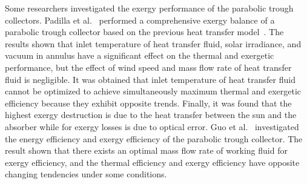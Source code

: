 Some researchers investigated the exergy performance of the parabolic trough collectors.
Padilla et al.~\cite{Padilla2014} performed a comprehensive exergy balance of a parabolic trough collector based on the previous heat transfer model~\cite{Padilla2011}. The results shown that inlet temperature of heat transfer fluid, solar irradiance, and vacuum in annulus have a significant effect on the thermal and exergetic performance, but the effect of wind speed and mass flow rate of heat transfer fluid is negligible. It was obtained that inlet temperature of heat transfer fluid cannot be optimized to achieve simultaneously maximum thermal and exergetic efficiency because they exhibit opposite trends. Finally, it was found that the highest exergy destruction is due to the heat transfer between the sun and the absorber while for exergy losses is due to optical error.
Guo et al.~\cite{JiangfengGuo2016-1} investigated the energy efficiency and exergy efficiency of the parabolic trough collector. The result shown that there exists an optimal mass flow rate of working fluid for exergy efficiency, and the thermal efficiency and exergy efficiency have opposite changing tendencies under some conditions.

